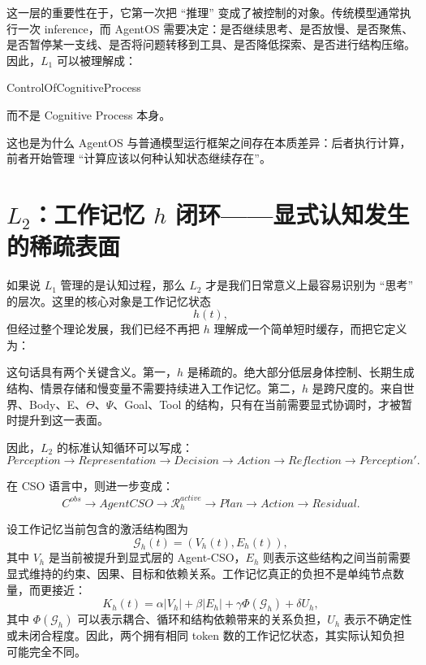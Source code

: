 这一层的重要性在于，它第一次把 ``推理'' 变成了被控制的对象。传统模型通常执行一次 inference，而 AgentOS 需要决定：是否继续思考、是否放慢、是否聚焦、是否暂停某一支线、是否将问题转移到工具、是否降低探索、是否进行结构压缩。因此，$L_1$ 可以被理解成：
\begin{statementbox}
ControlOfCognitiveProcess
\end{statementbox}
而不是 Cognitive Process 本身。

这也是为什么 AgentOS 与普通模型运行框架之间存在本质差异：后者执行计算，前者开始管理 ``计算应该以何种认知状态继续存在''。

\section{$L_2$：工作记忆 $h$ 闭环——显式认知发生的稀疏表面}

如果说 $L_1$ 管理的是认知过程，那么 $L_2$ 才是我们日常意义上最容易识别为 ``思考'' 的层次。这里的核心对象是工作记忆状态
\[
h(t),
\]
但经过整个理论发展，我们已经不再把 $h$ 理解成一个简单短时缓存，而把它定义为：
\begin{statementbox}
\centering
{}
\end{statementbox}

这句话具有两个关键含义。第一，$h$ 是稀疏的。绝大部分低层身体控制、长期生成结构、情景存储和慢变量不需要持续进入工作记忆。第二，$h$ 是跨尺度的。来自世界、Body、E、$\Theta$、$\Psi$、Goal、Tool 的结构，只有在当前需要显式协调时，才被暂时提升到这一表面。

因此，$L_2$ 的标准认知循环可以写成：
\[
Perception
\rightarrow
Representation
\rightarrow
Decision
\rightarrow
Action
\rightarrow
Reflection
\rightarrow
Perception'.
\]

在 CSO 语言中，则进一步变成：
\[
C^{obs}
\rightarrow
AgentCSO
\rightarrow
\mathcal{R}^{active}_h
\rightarrow
Plan
\rightarrow
Action
\rightarrow
Residual.
\]

设工作记忆当前包含的激活结构图为
\[
\mathcal{G}_h(t)
=
\left(
V_h(t),
E_h(t)
\right),
\]
其中 $V_h$ 是当前被提升到显式层的 Agent-CSO，$E_h$ 则表示这些结构之间当前需要显式维持的约束、因果、目标和依赖关系。工作记忆真正的负担不是单纯节点数量，而更接近：
\[
K_h(t)
=
\alpha |V_h|
+
\beta |E_h|
+
\gamma \Phi(\mathcal{G}_h)
+
\delta U_h,
\]
其中 $\Phi(\mathcal{G}_h)$ 可以表示耦合、循环和结构依赖带来的关系负担，$U_h$ 表示不确定性或未闭合程度。因此，两个拥有相同 token 数的工作记忆状态，其实际认知负担可能完全不同。

